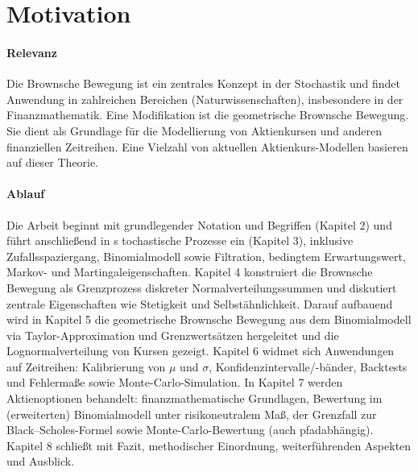 \section{Motivation}

\paragraph{Relevanz}
Die Brownsche Bewegung ist ein zentrales Konzept in der Stochastik und findet Anwendung in zahlreichen 
Bereichen (Naturwissenschaften), insbesondere in der Finanzmathematik. Eine Modifikation ist die geometrische Brownsche Bewegung. 
Sie dient als Grundlage für die Modellierung von Aktienkursen und anderen finanziellen Zeitreihen. Eine Vielzahl von
aktuellen Aktienkurs-Modellen basieren auf dieser Theorie.

\paragraph{Ablauf}
Die Arbeit beginnt mit grundlegender Notation und Begriffen (Kapitel 2) und führt anschließend in s
tochastische Prozesse ein (Kapitel 3), inklusive Zufallsspaziergang, Binomialmodell sowie Filtration, 
bedingtem Erwartungswert, Markov- und Martingaleigenschaften. Kapitel 4 konstruiert die Brownsche Bewegung 
als Grenzprozess diskreter Normalverteilungssummen und diskutiert zentrale Eigenschaften wie Stetigkeit und 
Selbstähnlichkeit. Darauf aufbauend wird in Kapitel 5 die geometrische Brownsche Bewegung aus dem Binomialmodell 
via Taylor-Approximation und Grenzwertsätzen hergeleitet und die Lognormalverteilung von Kursen gezeigt. 
Kapitel 6 widmet sich Anwendungen auf Zeitreihen: Kalibrierung von $\mu$ und $\sigma$, 
Konfidenzintervalle/-bänder, Backtests und Fehlermaße sowie Monte-Carlo-Simulation. In 
Kapitel 7 werden Aktienoptionen behandelt: finanzmathematische Grundlagen, Bewertung im 
(erweiterten) Binomialmodell unter risikoneutralem Maß, der Grenzfall zur Black–Scholes-Formel sowie 
Monte-Carlo-Bewertung (auch pfadabhängig). Kapitel 8 schließt mit Fazit, methodischer Einordnung, 
weiterführenden Aspekten und Ausblick.
